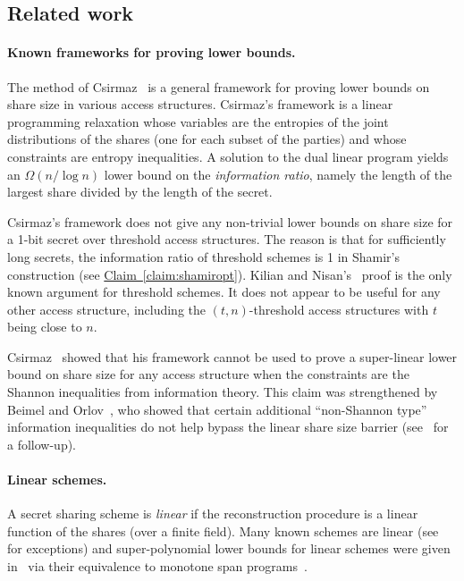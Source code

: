\documentclass[11pt]{article}
\numberwithin{equation}{section}
\theoremstyle{definition}
\theoremstyle{plain}
\newcommand{\expref}[2]{\hyperref[#2]{#1~\ref{#2}}}
\begin{document}
\subsection{Related work}
\paragraph{Known frameworks for proving lower bounds.}
The method of Csirmaz~\cite{Csirmaz97} is a 
general framework for proving lower bounds on share size in various access
structures.
Csirmaz's framework is a linear programming relaxation whose variables are the entropies of the joint distributions of the shares (one for each subset of the parties) and whose constraints are entropy inequalities.  A solution to the dual linear program yields an $\Omega(n/\log n)$ lower bound on the \emph{information ratio}, namely the length of the largest share divided by the length of the secret.

Csirmaz's framework does not give any non-trivial lower bounds on
share size for a 1-bit secret over threshold access
structures.  The reason is that for sufficiently long secrets, the information ratio of threshold schemes is 1 in Shamir's construction (see \expref{Claim}{claim:shamiropt}).  Kilian and
Nisan's~\cite{KilianN90} proof is the only known argument for threshold schemes.
It does not appear to be useful for any other access structure, including the
$(t,n)$-threshold access structures with $t$ being close to $n$.

Csirmaz~\cite{Csirmaz97} showed that his framework cannot be used to
prove a super-linear lower bound on share size for any access structure when the constraints are the Shannon inequalities from information theory. This 
claim was strengthened by Beimel and Orlov~\cite{BeimelO11}, who showed that certain additional 
``non-Shannon type'' information inequalities do not help bypass the linear share
size barrier (see~\cite{MolleviPY16} for a follow-up).

\paragraph{Linear schemes.}
A secret sharing scheme is \emph{linear} if the reconstruction procedure is a
linear function of the shares (over a finite field). Many known
schemes are linear (see~\cite{BeimelI01,BeimelW05,KomargodskiNY16,VaikuntanathanV15,BIVW,LiuVW17,LiuV18} for exceptions) and
super-polynomial lower bounds for linear schemes were given in~\cite{BabaiGW99,BeimelGP97,Gal01,pitassi-robere} via their equivalence to monotone span programs~\cite{KarchmerW93}. 
\end{document}
